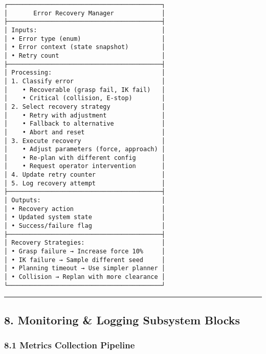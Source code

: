 \documentclass[
]{article}
\begin{document}
\begin{verbatim}
┌──────────────────────────────────────────┐
│       Error Recovery Manager             │
├──────────────────────────────────────────┤
│ Inputs:                                  │
│ • Error type (enum)                      │
│ • Error context (state snapshot)         │
│ • Retry count                            │
├──────────────────────────────────────────┤
│ Processing:                              │
│ 1. Classify error                        │
│    • Recoverable (grasp fail, IK fail)   │
│    • Critical (collision, E-stop)        │
│ 2. Select recovery strategy              │
│    • Retry with adjustment               │
│    • Fallback to alternative             │
│    • Abort and reset                     │
│ 3. Execute recovery                      │
│    • Adjust parameters (force, approach) │
│    • Re-plan with different config       │
│    • Request operator intervention       │
│ 4. Update retry counter                  │
│ 5. Log recovery attempt                  │
├──────────────────────────────────────────┤
│ Outputs:                                 │
│ • Recovery action                        │
│ • Updated system state                   │
│ • Success/failure flag                   │
├──────────────────────────────────────────┤
│ Recovery Strategies:                     │
│ • Grasp failure → Increase force 10%     │
│ • IK failure → Sample different seed     │
│ • Planning timeout → Use simpler planner │
│ • Collision → Replan with more clearance │
└──────────────────────────────────────────┘
\end{verbatim}

\begin{center}\rule{0.5\linewidth}{0.5pt}\end{center}

\hypertarget{monitoring-logging-subsystem-blocks}{%
\subsection{8. Monitoring \& Logging Subsystem
Blocks}\label{monitoring-logging-subsystem-blocks}}

\hypertarget{metrics-collection-pipeline}{%
\subsubsection{8.1 Metrics Collection
Pipeline}\label{metrics-collection-pipeline}}
\end{document}
